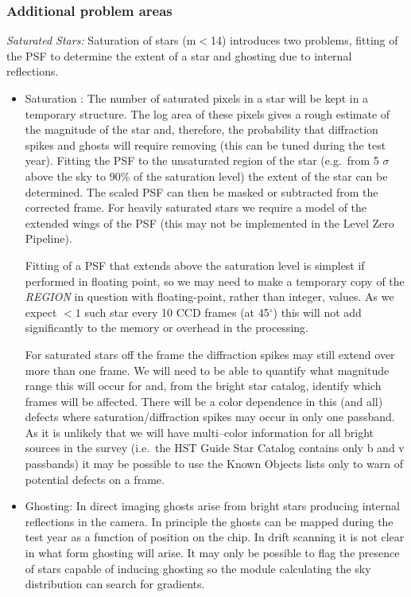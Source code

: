 \subsubsection {Additional problem areas}

{\it Saturated Stars:}
Saturation of stars (m$<$14) introduces two problems, fitting of the PSF to
determine the extent of a star and ghosting due to internal reflections.

\begin{itemize}
  \item Saturation : The number of saturated pixels in a star will be
kept in a temporary structure. The log area of these pixels gives
a rough estimate of the magnitude of the star and, therefore, the
probability that diffraction spikes and ghosts will require removing
(this can be tuned 
during the test year). Fitting the PSF to the unsaturated region of
the star (e.g.\ from 5 $\sigma$ above the sky to 90\% of the
saturation level) the extent of the star can be determined. The scaled
PSF can then be masked or subtracted from the corrected frame. For
heavily saturated stars we require a model of the extended wings of
the PSF (this may not be implemented in the Level Zero Pipeline).

Fitting of a PSF that extends above the saturation level is simplest if
performed in floating point,
so we may need to make a temporary copy of the {\it REGION} in question
with floating-point, rather than integer, values.
As we expect $<1$  such star every 10 
CCD frames (at 45$^\circ$)
this will not add significantly to the memory or overhead in the processing.

For saturated stars off the frame the diffraction spikes may still extend over
more than one frame. We will need to be able to quantify what
magnitude range this will occur for and, from the bright star catalog,
identify which frames will be affected. There will be a color
dependence in this (and all) defects where saturation/diffraction
spikes may occur in only one passband. As it is unlikely that we will
have multi--color information for all bright sources in the survey
(i.e.\ the HST Guide Star Catalog contains only b and v passbands) 
it may be possible to use the Known Objects lists 
only to warn of potential defects on a frame. 


  \item Ghosting: In direct imaging ghosts arise from bright stars producing
internal reflections in the camera. In principle the ghosts can be mapped
during the test year as a function of position on the chip. In drift scanning
it is not clear in what form ghosting will arise. It may only be possible to
flag the presence of stars capable of inducing ghosting so the module
calculating the sky distribution can search for gradients.


\end{itemize}
